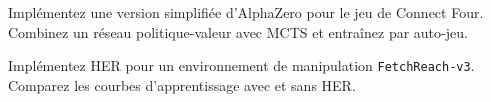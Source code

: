 \begin{exercice}[MCTS + RL]
Impl\'ementez une version simplifi\'ee d'AlphaZero pour le jeu de Connect Four.
Combinez un r\'eseau politique-valeur avec MCTS et entra\^inez par auto-jeu.
\end{exercice}

\begin{exercice}[HER]
Impl\'ementez HER pour un environnement de manipulation
\texttt{FetchReach-v3}. Comparez les courbes d'apprentissage avec et sans HER.
\end{exercice}
